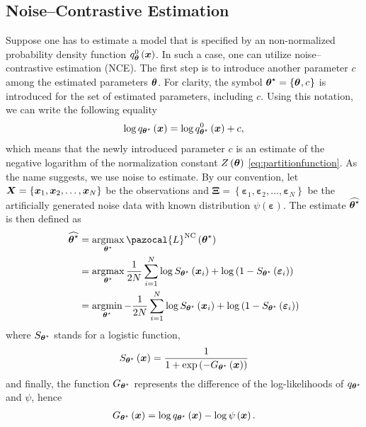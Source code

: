 \subsection{Noise--Contrastive Estimation}
Suppose one has to estimate a model that is specified by an non-normalized probability density function $q^0_{\boldsymbol{\theta}}\left(\boldsymbol{x}\right)$. In such a case, one can utilize noise--contrastive estimation (NCE). The first step is to introduce another parameter $c$ among the estimated parameters $\boldsymbol{\theta}$. For clarity, the symbol $\boldsymbol{\theta}^\star=\left\lbrace\boldsymbol{\theta}^{},c^{}_{}\right\rbrace$ is introduced for the set of estimated parameters, including
$c$. Using this notation, we can write the following equality
\begin{align}
    \log q_{\boldsymbol{\theta}^\star}\left(\boldsymbol{x}\right) = \log q_{\boldsymbol{\theta}^\star}^0\left(\boldsymbol{x}\right) + c,
    \end{align}
which means that the newly introduced parameter $c$ is an estimate of the negative logarithm of
the normalization constant $Z\left(\boldsymbol{\theta}\right)$ \eqref{eq:partitionfunction}.
As the name suggests, we use noise to estimate. By our convention, let $\boldsymbol{X} = \left\lbrace\boldsymbol{x}_1,\boldsymbol{x}_2,\dots,\boldsymbol{x}_N\right\rbrace$
be the observations and $\boldsymbol{\Xi} = \left\lbrace\boldsymbol{\varepsilon}_1,\boldsymbol{\varepsilon}_2,\dots,\boldsymbol{\varepsilon}_N\right\rbrace$ be the artificially generated noise data with known distribution $\psi\left(\boldsymbol{\varepsilon}\right)$. The estimate $\widehat{\boldsymbol{\theta}^\star}$ is then defined as
\begin{align}
    \widehat{\bt^\star} &= \argmax_{\bt^\star} \pazocal{L}^{\mathrm{NC}}\left(\bt^\star\right)\\
   &= \argmax_{\bt^\star} \frac{1}{2N}\sum_{i=1}^N \log S_{\bt^\star}\left(\bx_i\right) + \log\left(1-S_{\bt^\star}\left(\boldsymbol{\varepsilon}_i\right) \right)\label{NCEloss1}\\
   &= \argmin_{\bt^\star} -\frac{1}{2N}\sum_{i=1}^N \log S_{\bt^\star}\left(\bx_i\right) + \log\left(1-S_{\bt^\star}\left(\boldsymbol{\varepsilon}_i\right) \right)\label{NCEloss2}
\end{align}
where $S_{\boldsymbol{\theta}^\star}$ stands for a logistic function,
\begin{align}
S_{\boldsymbol{\theta}^\star}\left(\boldsymbol{x}\right) = \frac{1}{1 + \exp\left(-G_{\boldsymbol{\theta}^\star}\left(\boldsymbol{x}\right) \right)}
\end{align}
and finally, the function $G_{\boldsymbol{\theta}^\star}$ represents the difference of the log-likelihoods of $q_{\boldsymbol{\theta}^\star}$ and $\psi$, hence 
\begin{align}\label{eq:NCE_G}
    G_{\boldsymbol{\theta}^\star}\left(\boldsymbol{x}\right) = \log q_{\boldsymbol{\theta}^\star}\left(\boldsymbol{x} \right) - \log\psi\left(\boldsymbol{x} \right).
\end{align}
